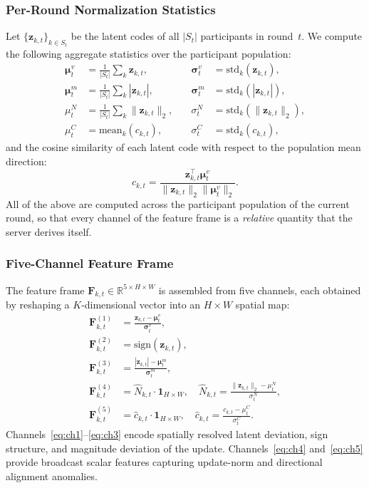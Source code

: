 \documentclass[journal]{IEEEtran}
\begin{document}
\subsubsection{Per-Round Normalization Statistics}
Let $\{\mathbf{z}_{k,t}\}_{k \in S_t}$ be the latent codes of all $|S_t|$ participants in round~$t$. We compute the following aggregate statistics over the participant population:
\begin{align}
\boldsymbol{\mu}_t^v &= \frac{1}{|S_t|} \sum_k \mathbf{z}_{k,t}, &\quad \boldsymbol{\sigma}_t^v &= \text{std}_k(\mathbf{z}_{k,t}), \label{eq:stats_v}\\
\boldsymbol{\mu}_t^m &= \frac{1}{|S_t|} \sum_k |\mathbf{z}_{k,t}|, &\quad \boldsymbol{\sigma}_t^m &= \text{std}_k(|\mathbf{z}_{k,t}|), \label{eq:stats_m}\\
\mu_t^N &= \frac{1}{|S_t|} \sum_k \|\mathbf{z}_{k,t}\|_2, &\quad \sigma_t^N &= \text{std}_k(\|\mathbf{z}_{k,t}\|_2), \label{eq:stats_n}\\
\mu_t^C &= \text{mean}_k(c_{k,t}), &\quad \sigma_t^C &= \text{std}_k(c_{k,t}), \label{eq:stats_c}
\end{align}
and the cosine similarity of each latent code with respect to the population mean direction:
\begin{equation}
c_{k,t} = \frac{\mathbf{z}_{k,t}^\top \boldsymbol{\mu}_t^v}{\|\mathbf{z}_{k,t}\|_2 \|\boldsymbol{\mu}_t^v\|_2}.
\label{eq:cosine}
\end{equation}
All of the above are computed across the participant population of the current round, so that every channel of the feature frame is a \emph{relative} quantity that the server derives itself.

\subsubsection{Five-Channel Feature Frame}
The feature frame $\mathbf{F}_{k,t} \in \mathbb{R}^{5 \times H \times W}$ is assembled from five channels, each obtained by reshaping a $K$-dimensional vector into an $H \times W$ spatial map:
\begin{align}
\mathbf{F}_{k,t}^{(1)} &= \frac{\mathbf{z}_{k,t} - \boldsymbol{\mu}_t^v}{\boldsymbol{\sigma}_t^v}, \label{eq:ch1}\\
\mathbf{F}_{k,t}^{(2)} &= \text{sign}(\mathbf{z}_{k,t}), \label{eq:ch2}\\
\mathbf{F}_{k,t}^{(3)} &= \frac{|\mathbf{z}_{k,t}| - \boldsymbol{\mu}_t^m}{\boldsymbol{\sigma}_t^m}, \label{eq:ch3}\\
\mathbf{F}_{k,t}^{(4)} &= \hat{N}_{k,t} \cdot \mathbf{1}_{H \times W}, \quad \hat{N}_{k,t} = \frac{\|\mathbf{z}_{k,t}\|_2 - \mu_t^N}{\sigma_t^N}, \label{eq:ch4}\\
\mathbf{F}_{k,t}^{(5)} &= \hat{c}_{k,t} \cdot \mathbf{1}_{H \times W}, \quad \hat{c}_{k,t} = \frac{c_{k,t} - \mu_t^C}{\sigma_t^C}. \label{eq:ch5}
\end{align}
Channels~\eqref{eq:ch1}--\eqref{eq:ch3} encode spatially resolved latent deviation, sign structure, and magnitude deviation of the update. Channels~\eqref{eq:ch4} and~\eqref{eq:ch5} provide broadcast scalar features capturing update-norm and directional alignment anomalies.
\end{document}
